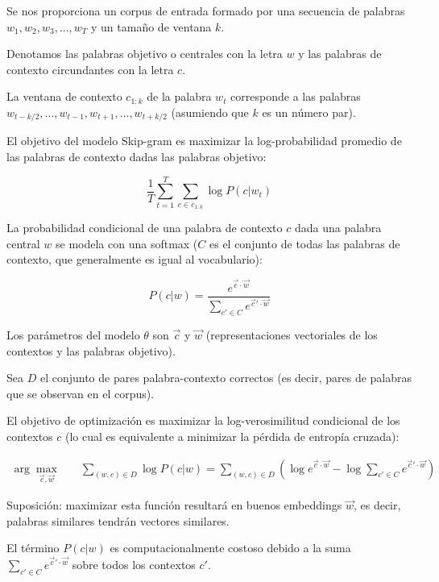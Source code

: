 Se nos proporciona un corpus de entrada formado por una secuencia de palabras $w_1, w_2, w_3, . . . , w_T$ y un tamaño de ventana $k$.

Denotamos las palabras objetivo o centrales con la letra $w$ y las palabras de contexto circundantes con la letra $c$.

La ventana de contexto $c_{1:k}$ de la palabra $w_t$ corresponde a las palabras $w_{t-k/2},\dots, w_{t-1}, w_{t+1}, \dots, w_{t+k/2}$ (asumiendo que $k$ es un número par).

El objetivo del modelo Skip-gram es maximizar la log-probabilidad promedio de las palabras de contexto dadas las palabras objetivo:

\begin{displaymath}
\frac{1}{T} \sum_{t=1}^T \sum_{c \in c_{1:k}} \log P(c|w_t)
\end{displaymath}

La probabilidad condicional de una palabra de contexto $c$ dada una palabra central $w$ se modela con una softmax ($C$ es el conjunto de todas las palabras de contexto, que generalmente es igual al vocabulario):

\begin{displaymath}
P(c|w) = \frac{e^{\vec{c}\cdot \vec{w}}}{\sum_{c'\in C} e^{\vec{c}'\cdot \vec{w}}}
\end{displaymath}

Los parámetros del modelo $\theta$ son $\vec{c}$ y $\vec{w}$ (representaciones vectoriales de los contextos y las palabras objetivo).

Sea $D$ el conjunto de pares palabra-contexto correctos (es decir, pares de palabras que se observan en el corpus).

El objetivo de optimización es maximizar la log-verosimilitud condicional de los contextos $c$ (lo cual es equivalente a minimizar la pérdida de entropía cruzada):

\begin{equation}
\begin{split}
\operatorname{arg} \max_{\vec{c}, \vec{w}} & \quad \sum_{(w,c) \in D}{\log P(c|w)} = \sum_{(w,c) \in D} ( \log e^{\vec{c}\cdot \vec{w}} - \log \sum_{c'\in C} e^{\vec{c}'\cdot \vec{w}} )
\end{split}
\end{equation}

Suposición: maximizar esta función resultará en buenos embeddings $\vec{w}$, es decir, palabras similares tendrán vectores similares.

El término $P(c|w)$ es computacionalmente costoso debido a la suma $\sum_{c'\in C} e^{\vec{c}'\cdot \vec{w}}$ sobre todos los contextos $c'$.

